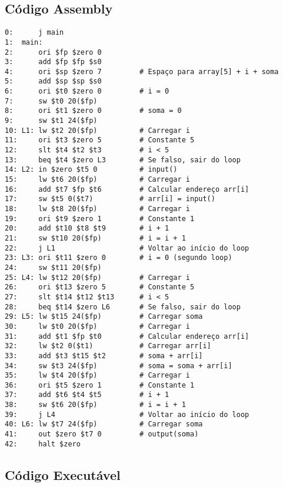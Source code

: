 \documentclass[
	12pt,				%
	oneside,
	a4paper,			%
	english,			%
	french,				%
	spanish,			%
	brazil,				%
	]{abntex2}
\begin{document}
\subsection{Código Assembly}

\begin{lstlisting}[style=assemblystyle, caption=Exemplo 3: Código assembly MIPS (trecho)]
0:      j main
1:  main:
2:      ori $fp $zero 0
3:      add $fp $fp $s0
4:      ori $sp $zero 7         # Espaço para array[5] + i + soma
5:      add $sp $sp $s0
6:      ori $t0 $zero 0         # i = 0
7:      sw $t0 20($fp)
8:      ori $t1 $zero 0         # soma = 0
9:      sw $t1 24($fp)
10: L1: lw $t2 20($fp)          # Carregar i
11:     ori $t3 $zero 5         # Constante 5
12:     slt $t4 $t2 $t3         # i < 5
13:     beq $t4 $zero L3        # Se falso, sair do loop
14: L2: in $zero $t5 0          # input()
15:     lw $t6 20($fp)          # Carregar i
16:     add $t7 $fp $t6         # Calcular endereço arr[i]
17:     sw $t5 0($t7)           # arr[i] = input()
18:     lw $t8 20($fp)          # Carregar i
19:     ori $t9 $zero 1         # Constante 1
20:     add $t10 $t8 $t9        # i + 1
21:     sw $t10 20($fp)         # i = i + 1
22:     j L1                    # Voltar ao início do loop
23: L3: ori $t11 $zero 0        # i = 0 (segundo loop)
24:     sw $t11 20($fp)
25: L4: lw $t12 20($fp)         # Carregar i
26:     ori $t13 $zero 5        # Constante 5
27:     slt $t14 $t12 $t13      # i < 5
28:     beq $t14 $zero L6       # Se falso, sair do loop
29: L5: lw $t15 24($fp)         # Carregar soma
30:     lw $t0 20($fp)          # Carregar i
31:     add $t1 $fp $t0         # Calcular endereço arr[i]
32:     lw $t2 0($t1)           # Carregar arr[i]
33:     add $t3 $t15 $t2        # soma + arr[i]
34:     sw $t3 24($fp)          # soma = soma + arr[i]
35:     lw $t4 20($fp)          # Carregar i
36:     ori $t5 $zero 1         # Constante 1
37:     add $t6 $t4 $t5         # i + 1
38:     sw $t6 20($fp)          # i = i + 1
39:     j L4                    # Voltar ao início do loop
40: L6: lw $t7 24($fp)          # Carregar soma
41:     out $zero $t7 0         # output(soma)
42:     halt $zero
\end{lstlisting}

\subsection{Código Executável}
\end{document}
